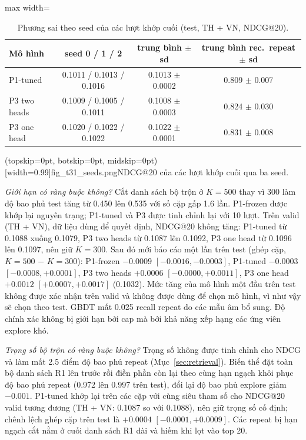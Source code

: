 \documentclass[jtehm]{ieeeaccess}
\begin{document}
\begin{table}[t]
\caption{Phương sai theo seed của các lượt khớp cuối (test, TH + VN, NDCG@20).}
\label{tab:seeds}
\setlength{\tabcolsep}{3pt}
\centering
\begin{adjustbox}{max width=\columnwidth}
\begin{tabular}{lccc}
\toprule
Mô hình & seed 0 / 1 / 2 & trung bình $\pm$ sd & trung bình rec.\ repeat $\pm$ sd \\
\midrule
P1-tuned     & 0.1011 / 0.1013 / 0.1016 & 0.1013 $\pm$ 0.0002 & 0.809 $\pm$ 0.007 \\
P3 two heads & 0.1009 / 0.1005 / 0.1011 & 0.1008 $\pm$ 0.0003 & 0.824 $\pm$ 0.030 \\
P3 one head  & 0.1020 / 0.1022 / 0.1022 & 0.1022 $\pm$ 0.0001 & 0.831 $\pm$ 0.008 \\
\bottomrule
\end{tabular}
\end{adjustbox}
\end{table}

\Figure[t!](topskip=0pt, botskip=0pt, midskip=0pt)[width=0.99\columnwidth]{fig_t31_seeds.png}{NDCG@20 của các lượt khớp cuối qua ba seed.\label{fig:seeds}}

\textit{Giới hạn có ràng buộc không?} Cắt danh sách bộ trộn ở $K = 500$ thay vì 300 làm độ bao phủ test tăng từ 0.450 lên 0.535 với số cặp gấp 1.6 lần. P1-frozen được khớp lại nguyên trạng; P1-tuned và P3 được tinh chỉnh lại với 10 lượt. Trên valid (TH + VN), dữ liệu dùng để quyết định, NDCG@20 không tăng: P1-tuned từ 0.1088 xuống 0.1079, P3 two heads từ 0.1087 lên 0.1092, P3 one head từ 0.1096 lên 0.1097, nên giữ $K = 300$. Sau đó mới báo cáo một lần trên test (ghép cặp, $K = 500$ $-$ $K = 300$): P1-frozen $-0.0009$ $[-0.0016, -0.0003]$, P1-tuned $-0.0003$ $[-0.0008, +0.0001]$, P3 two heads $+0.0006$ $[-0.0000, +0.0011]$, P3 one head $+0.0012$ $[+0.0007, +0.0017]$ (0.1032). Mức tăng của mô hình một đầu trên test không được xác nhận trên valid và không được dùng để chọn mô hình, vì như vậy sẽ chọn theo test. GBDT mất 0.025 recall repeat do các mẫu âm bổ sung. Độ chính xác không bị giới hạn bởi cap mà bởi khả năng xếp hạng các ứng viên explore khó.

\textit{Trọng số bộ trộn có ràng buộc không?} Trọng số không được tinh chỉnh cho NDCG và làm mất 2.5 điểm độ bao phủ repeat (Mục~\ref{sec:retrieval}). Biến thể đặt toàn bộ danh sách R1 lên trước rồi điền phần còn lại theo cùng hạn ngạch khôi phục độ bao phủ repeat (0.972 lên 0.997 trên test), đổi lại độ bao phủ explore giảm $-0.001$. P1-tuned khớp lại trên các cặp với cùng siêu tham số cho NDCG@20 valid tương đương (TH + VN: 0.1087 so với 0.1088), nên giữ trọng số cố định; chênh lệch ghép cặp trên test là $+0.0004$ $[-0.0001, +0.0009]$. Các repeat bị hạn ngạch cắt nằm ở cuối danh sách R1 dài và hiếm khi lọt vào top 20.
\end{document}
